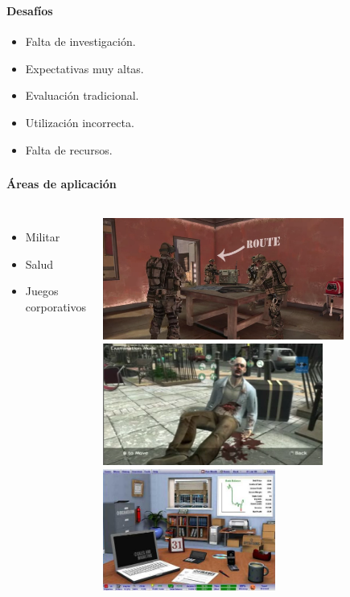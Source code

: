 \begin{frame}
    \frametitle{\pagetitle}
    \framesubtitle{Desafíos}
	\begin{itemize}[<+->]
        \item Falta de investigación.
        \item Expectativas muy altas.
        \item Evaluación tradicional.
        \item Utilización incorrecta.
        \item Falta de recursos.
    \end{itemize}
\end{frame}

\begin{frame}
\frametitle{\pagetitle}
\framesubtitle{Áreas de aplicación}

\pause{}
\begin{columns}
 \hspace{0.5cm}
\begin{itemize}[<+->]
	 \item Militar
     \item Salud
     \item Juegos corporativos
\end{itemize}

 \hspace{0.5cm}
\begin{overprint}
     \includegraphics[width=\textwidth, height=4cm]{../tics/images/army} 
     \includegraphics[width=\textwidth, height=4cm]{../tics/images/patient} 
     \includegraphics[width=\textwidth, height=4cm]{../tics/images/simventure} 
    

\end{overprint}
\end{columns}
\end{frame}
